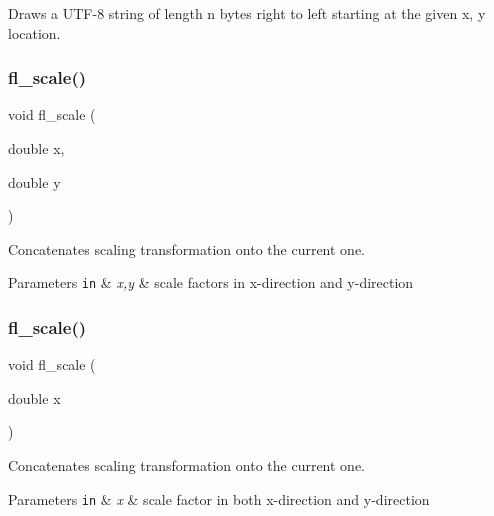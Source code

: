 Draws a U\+T\+F-\/8 string of length {\ttfamily n} bytes right to left starting at the given {\ttfamily x}, {\ttfamily y} location. \mbox{\label{group__fl__drawings_ga60522372d52422ab427d540d375a43ad}} 
\subsubsection{\texorpdfstring{fl\+\_\+scale()}{fl\_scale()}\hspace{0.1cm}{\footnotesize\ttfamily [1/2]}}
{\footnotesize\ttfamily void fl\+\_\+scale (\begin{DoxyParamCaption}\item[{double}]{x,  }\item[{double}]{y }\end{DoxyParamCaption})\hspace{0.3cm}{\ttfamily [inline]}}

Concatenates scaling transformation onto the current one. 
\begin{DoxyParams}[1]{Parameters}
\mbox{\tt in}  & {\em x,y} & scale factors in x-\/direction and y-\/direction \\
\hline
\end{DoxyParams}
\mbox{\label{group__fl__drawings_ga055ef231c1621acbd571c12b995676f0}} 
\subsubsection{\texorpdfstring{fl\+\_\+scale()}{fl\_scale()}\hspace{0.1cm}{\footnotesize\ttfamily [2/2]}}
{\footnotesize\ttfamily void fl\+\_\+scale (\begin{DoxyParamCaption}\item[{double}]{x }\end{DoxyParamCaption})\hspace{0.3cm}{\ttfamily [inline]}}

Concatenates scaling transformation onto the current one. 
\begin{DoxyParams}[1]{Parameters}
\mbox{\tt in}  & {\em x} & scale factor in both x-\/direction and y-\/direction \\
\hline
\end{DoxyParams}
\mbox{\label{group__fl__drawings_gaef4a0d81bfafaeb3be15a55b9b58ba5f}} 
